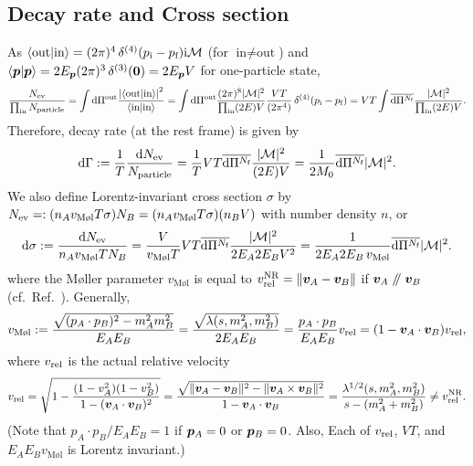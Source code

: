 \documentclass[CheatSheet]{subfiles}
\begin{document}
\subsection{Decay rate and Cross section}
As
$\braket{\text{out}|\text{in}}=(2\pi)^4\diracdelta[4](p\w i-p\w f)\ii\mathcal M$
(for $\text{in}\neq\text{out}$) and $\braket{\vc p|\vc p}=2E_{\vc p}(2\pi)^3\diracdelta[3](\vc 0)=2E_\vc {p}V$ for one-particle state,
\begin{equation}
 \frac{N\w{ev}}{\prod\w{in} N\w{particle}}
= \int\dd\Pi^{\mathrm{out}}\frac{\left|\braket{\text{out}|\text{in}}\right|^2}{\braket{\text{in}|\text{in}}}
= \int\dd\Pi^{\mathrm{out}}\frac{(2\pi)^8|\mathcal M|^2}{\prod\w{in}(2E)V}
\frac{VT}{(2\pi^4)}\diracdelta[4](p\w i-p\w f)
= VT\int\overline{\dd\Pi^{N\w f}}\frac{|\mathcal M|^2}{\prod\w{in}(2E)V}.
\end{equation}
Therefore, decay rate (at the rest frame) is given by
\begin{equation}
 \mathop{}\!\mathrm{d}\Gamma
:= \frac{1}{T}\frac{\mathop{}\!\mathrm{d} N_{\text{ev}}}{N_{\text{particle}}}
 = \frac{1}{T}VT\overline{\mathop{}\!\mathrm{d}\Pi^{N_{\text{f}}}}\frac{|\mathcal M|^2}{(2E)V}
 = \frac{1}{2M_0}\overline{\mathop{}\!\mathrm{d}\Pi^{N_{\text{f}}}}{|\mathcal M|^2}.
\end{equation}
We also define Lorentz-invariant cross section $\sigma$ by $N\w{ev}=:(n_A v_{\text{M\o l}}T\sigma)N_B=(n_A v_{\text{M\o l}}T\sigma)(n_B V)$ with
number density $n$, or
\begin{equation}
\dd\sigma:=\frac{\dd N\w{ev}}{n_A v_{\text{M\o l}}TN_B}
=
\frac{V}{v_{\text{M\o l}}T}
VT\overline{\dd\Pi^{N\w f}}\frac{|\mathcal M|^2}{2E_A2E_BV^2}
=
\frac{1}{2E_A2E_B\,v_{\text{M\o l}}}
\overline{\dd\Pi^{N\w f}}|\mathcal M|^2.
\end{equation}
where the M\o ller parameter $v_{\text{M\o l}}$ is equal to $v^{\mathrm{NR}}_{\text{rel}}=\|{\boldsymbol{v}}_A-{\boldsymbol{v}}_B\|$ if ${\boldsymbol{v}}_A\mathrel{/\mkern-5mu/}{\boldsymbol{v}}_B$ (cf.~Ref.~\cite{Cannoni:2016hro}).
Generally,
\begin{equation}
  v_{\text{M\o l}}:=
 \frac{\sqrt{(p_A\cdot p_B)^2-m_A^2m_B^2}}{E_AE_B}
=\frac{\sqrt{\Kallen(s,m_A^2,m_B^2)}}{2E_AE_B}
=\frac{p_A\cdot p_B}{E_A E_B}v\w{rel}
=({1-\vc v_A\cdot\vc v_B})v\w{rel},
\end{equation}
where $v_{\text{rel}}$ is the actual relative velocity
\begin{equation}
  v_{\text{rel}}
=\sqrt{1-\frac{(1-v_A^2)(1-v_B^2)}{1-({\boldsymbol{v}}_A\cdot{\boldsymbol{v}}_B)^2}}
=\frac{\sqrt{\|{\boldsymbol{v}}_A-{\boldsymbol{v}}_B\|^2-\|{\boldsymbol{v}}_A\times{\boldsymbol{v}}_B\|^2}}{1-{\boldsymbol{v}}_A\cdot{\boldsymbol{v}}_B}
=\frac{\mathop{\lambda^{1/2}}(s,m_A^2,m_B^2)}{s-(m_A^2+m_B^2)}\neq v^{\mathrm{NR}}_{\text{rel}}.
\end{equation}
(Note that $p_A\cdot p_B/E_AE_B=1$ if ${\boldsymbol{p}}_A=0$ or ${\boldsymbol{p}}_B=0$. Also, Each of $v_{\text{rel}}$, $VT$, and $E_AE_Bv_{\text{M\o l}}$ is Lorentz invariant.)
\end{document}
